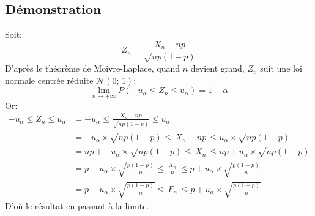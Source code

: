 \documentclass[12px]{article}
\begin{document}
	\subsection{Démonstration}
	Soit:
	\begin{displaymath}
		Z_n= \frac{X_n-np}{\sqrt{np(1-p)}}
	\end{displaymath}
	D'après le théorème de Moivre-Laplace, quand $n$ devient grand, $Z_n$ suit une loi normale centrée réduite $\mathcal{N}(0;\, 1):$\\
	\begin{displaymath}
		\lim\limits_{n\rightarrow +\infty}P(-u_\alpha\leq Z_n \leq u_\alpha) = 1-\alpha
	\end{displaymath}
	Or:
	\begin{align*}
		-u_\alpha\leq Z_n \leq u_\alpha
		&= -u_\alpha\leq \frac{X_n-np}{\sqrt{np(1-p)}} \leq u_\alpha\\
		&= -u_\alpha\times\sqrt{np(1-p)}\leq\, X_n-np\, \leq u_\alpha\times\sqrt{np(1-p)}\\
		&= np+-u_\alpha\times\sqrt{np(1-p)}\leq\, X_n\, \leq np+u_\alpha\times\sqrt{np(1-p)}\\
		&= p-u_\alpha\times\sqrt{ \frac{p(1-p)}{n} }\leq\, \frac{X_n}{n}\, \leq p+u_\alpha\times\sqrt{ \frac{p(1-p)}{n} }\\
		&= p-u_\alpha\times\sqrt{ \frac{p(1-p)}{n} }\leq\, F_n\, \leq p+u_\alpha\times\sqrt{ \frac{p(1-p)}{n} }
	\end{align*}
	D'où le résultat en passant à la limite.
	
\end{document}

